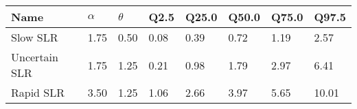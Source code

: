 \begin{tabular}{llllllll}
\toprule
Name & $\alpha$ & $\theta$ & Q2.5 & Q25.0 & Q50.0 & Q75.0 & Q97.5\\
\midrule
Slow SLR & 1.75 & 0.50 & 0.08 & 0.39 & 0.72 & 1.19 & 2.57\\
Uncertain SLR & 1.75 & 1.25 & 0.21 & 0.98 & 1.79 & 2.97 & 6.41\\
Rapid SLR & 3.50 & 1.25 & 1.06 & 2.66 & 3.97 & 5.65 & 10.01\\
\bottomrule
\end{tabular}
